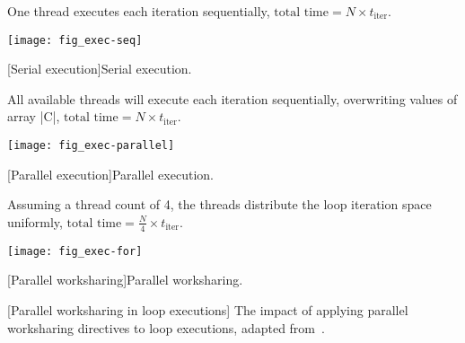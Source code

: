 \begin{center}
\begin{minipage}{\textwidth}
One thread executes each iteration sequentially, \(\text{total time} = N \times t_\text{iter}\).
\begin{center}
\captionsetup{type=lstlisting}
\begin{minipage}{.45\textwidth}
\end{minipage}\hfill%
\begin{minipage}{.45\textwidth}
\hfill\texttt{[image: fig\_exec-seq]}
\end{minipage}
[Serial execution]{Serial execution.}
\label{lst:serial}
\end{center}
All available threads will execute each iteration sequentially, overwriting values of array \pr|C|, \(\text{total time} = N \times t_\text{iter}\).
\begin{center}
\captionsetup{type=lstlisting}
\begin{minipage}{.45\textwidth}
\end{minipage}\hfill%
\begin{minipage}{.45\textwidth}
\hfill\texttt{[image: fig\_exec-parallel]}
\end{minipage}
[Parallel execution]{Parallel execution.}
\label{lst:just-parallel}
\end{center}
Assuming a thread count of 4, the threads distribute the loop iteration space uniformly, \(\text{total time} = \frac{N}{4} \times t_\text{iter}\).
\begin{center}
\captionsetup{type=lstlisting}
\begin{minipage}{.45\textwidth}
\end{minipage}\hfill
\begin{minipage}{.45\textwidth}
\hfill\texttt{[image: fig\_exec-for]}
\end{minipage}
[Parallel worksharing]{Parallel worksharing.}
\label{lst:parallel-for}
\end{center}
[Parallel worksharing in loop executions]
{The impact of applying parallel worksharing directives to loop executions, adapted from~\textcite{oak-slides}.}
\label{fig:parallel-for}
\end{minipage}
\end{center}

